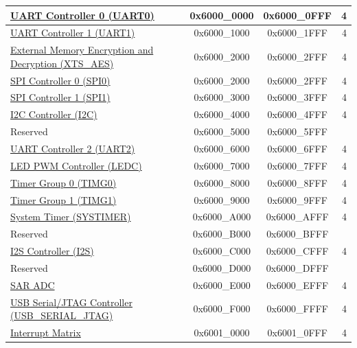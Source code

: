 \begin{ThreePartTable}
\begin{longtable}[c]{ |p{7cm}|c|c|r| }
\hyperref[mod:uart]{UART Controller 0 (UART0)}           & 0x6000\_0000 & 0x6000\_0FFF &   4\\\hline
\hyperref[mod:uart]{UART Controller 1 (UART1)}           & 0x6000\_1000 & 0x6000\_1FFF &   4\\\hline
\hyperref[mod:extmemencr]{External Memory Encryption and Decryption (XTS\_AES)} \tnote{\textcolor{red}{1}}           & 0x6000\_2000 & 0x6000\_2FFF &   4\\\hline
\hyperref[mod:spi]{SPI Controller 0 (SPI0)}  \tnote{\textcolor{red}{1}}          & 0x6000\_2000 & 0x6000\_2FFF &   4\\\hline
\hyperref[mod:spi]{SPI Controller 1 (SPI1)}            & 0x6000\_3000 & 0x6000\_3FFF &   4\\\hline
\hyperref[mod:i2c]{I2C Controller (I2C)}            & 0x6000\_4000 & 0x6000\_4FFF &   4 \\\hline
    \rowcolor{gray!25}  Reserved                    & 0x6000\_5000 & 0x6000\_5FFF &        \\\hline
\hyperref[mod:uart]{UART Controller 2 (UART2)}           & 0x6000\_6000 & 0x6000\_6FFF &   4\\\hline
\hyperref[mod:ledpwm]{LED PWM Controller (LEDC)}& 0x6000\_7000 & 0x6000\_7FFF &   4     \\\hline
\hyperref[mod:timg]{Timer Group 0 (TIMG0)}               & 0x6000\_8000 & 0x6000\_8FFF &   4     \\\hline
\hyperref[mod:timg]{Timer Group 1 (TIMG1)}               & 0x6000\_9000 & 0x6000\_9FFF &   4     \\\hline
\hyperref[mod:systimer]{System Timer (SYSTIMER)}                    & 0x6000\_A000 & 0x6000\_AFFF &   4        \\\hline
\rowcolor{gray!25}  Reserved                    & 0x6000\_B000 & 0x6000\_BFFF &        \\\hline
\hyperref[mod:i2s]{I2S Controller (I2S)}            & 0x6000\_C000 & 0x6000\_CFFF &   4     \\\hline
\rowcolor{gray!25}  Reserved                    & 0x6000\_D000 & 0x6000\_DFFF &        \\\hline
\hyperref[mod:adc]{SAR ADC}              & 0x6000\_E000 & 0x6000\_EFFF &   4        \\\hline
\hyperref[mod:usbserialjtag]{USB Serial/JTAG Controller (USB\_SERIAL\_JTAG)}                  & 0x6000\_F000 & 0x6000\_FFFF &   4     \\\hline                
\hyperref[mod:intmtrx]{Interrupt Matrix}            & 0x6001\_0000 & 0x6001\_0FFF &   4     \\\hline

\end{longtable}
\end{ThreePartTable}
